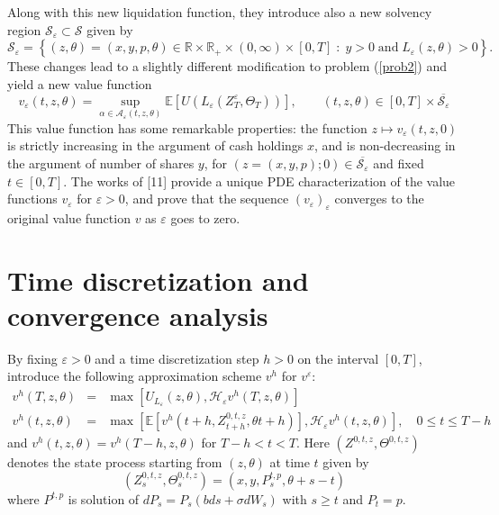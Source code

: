 \documentclass{article}
\newcommand{\bequ}{\begin{equation}}
\newcommand{\eequ}{\end{equation}}
\begin{document}
\par Along with this new liquidation function, they introduce also a new solvency region $\mathcal{S}_\varepsilon \subset \mathcal{S}$ given by
\[
\mathcal{S}_\varepsilon = \left\{(z, \theta) = (x, y, p, \theta) \in \mathbb{R}\times\mathbb{R}_+\times (0,\infty)\times [0, T] \; : \; y > 0 \; \textrm{and}\; L_{\varepsilon}(z,\theta) > 0\right\}.
\] 
These changes lead to a slightly different modification to problem (\ref{prob2}) and yield a new value function
\bequ
\label{prob3}
v_{\varepsilon}(t, z, \theta) = \sup\limits_{\alpha \in \mathcal{A}_\varepsilon (t,z,\theta)}\mathbb{E}\left[U\left(L_\varepsilon \left(Z^\varepsilon _T, \Theta_T\right)\right)\right], \qquad \left( {t,z,\theta } \right) \in \left[ {0,T} \right] \times \overline {\mathcal{S}_\varepsilon }
\eequ
This value function has some remarkable properties: the function $z \mapsto v_\varepsilon (t, z, 0)$ is strictly increasing in the argument of cash holdings $x$, and is non-decreasing in the argument of number of shares $y$, for $(z = (x, y, p); 0) \in \overline {\mathcal{S}_\varepsilon}$ and fixed $t \in [0, T]$. The works of [11] provide a unique PDE characterization of the value functions $v_\varepsilon$ for  $\varepsilon > 0$, and prove that the sequence $\left(v_\varepsilon\right)_\varepsilon$ converges to the original value function $v$ as $\varepsilon$ goes to zero.


\section{Time discretization and convergence analysis}
\par By fixing $\varepsilon > 0$ and a time discretization step $h > 0$ on the interval $[0, T]$, \cite{GMP} introduce the following approximation scheme $v^h$ for $v^\varepsilon$: 
\begin{eqnarray}
{v^{h}}(T,z,\theta ) &=& \max \left[ {{U_{L_\varepsilon }}\left( {z,\theta } \right),{\mathcal{H}_\varepsilon }{v^{h}}(T,z,\theta )} \right]
\label{3.3}
\\
{v^{h}}(t,z,\theta ) &=& \max \left[ {\mathbb{E}\left[ {{v^{h}}\left( {t + h,Z_{t + h}^{0,t,z},\theta t + h} \right)} \right],{\mathcal{H}_\varepsilon }{v^{h}}(t,z,\theta )} \right], \quad 0 \le t \le T - h
\label{3.4}
\end{eqnarray}
and $v^h (t,z,\theta) = v^h (T-h,z,\theta)$ for $T-h < t < T$. Here $\left( {{Z^{0,t,z}},{\Theta ^{0,t,z}}} \right)$ denotes the state process starting from $(z, \theta)$ at time $t$ given by
\[
\left( {Z_s^{0,t,z},\Theta _s^{0,t,z}} \right) = \left( {x,y,P_s^{t,p},\theta  + s - t} \right)
\]
where $P^{t,p}$ is solution of $dP_s = P_s\left(bds + \sigma dW_s\right)$ with $s \ge t$ and $P_t = p$. 
\end{document}
